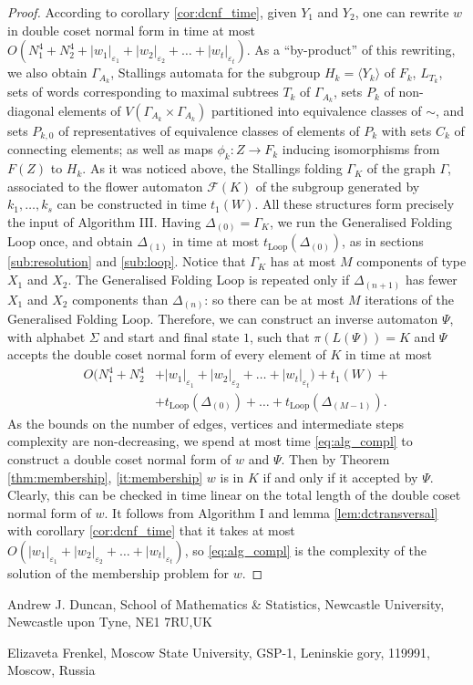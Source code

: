 \documentclass[a4paper,12pt]{article}
\newcommand{\G}{\Gamma }
\newcommand{\D}{\Delta }
\newcommand{\e}{\varepsilon }
\newcommand{\cF}{{\cal{F}}}
\numberwithin{equation}{section}
\numberwithin{figure}{section}
\newcommand{\Loop}{\operatorname{Loop}}
\renewcommand{\cF}{\mathcal{F}}
\newcommand{\la}{\langle}
\newcommand{\ra}{\rangle}
\newcommand{\maps}{\rightarrow}
\begin{document}
\begin{proof}
According to corollary \ref{cor:dcnf_time}, given $Y_1$ and $Y_2$, one can rewrite $w$ in double coset normal form in time at most 
$O(N_1^4 + N_2^4+ |w_1|_{\e_1}+|w_2|_{\e_2}+
\ldots +|w_t|_{\e_t}).$
 As a ``by-product'' of this rewriting, we also obtain $\G_{A_k}$, Stallings automata for the subgroup $H_k=\la Y_k\ra$ of $F_k$,
$L_{T_k}$, sets of words corresponding to maximal subtrees $T_k$ of $\G_{A_k}$,  sets $P_k$ of non-diagonal elements of $V( \G_{A_k}\times \G_{A_k})$
partitioned into equivalence classes of $\sim$, and sets $P_{k,0}$ of representatives of equivalence classes of
elements of $P_k$ with sets $C_k$ of connecting elements; as well as 
maps $\phi_k:Z\maps F_k$ inducing isomorphisms from $F(Z)$ to $H_k$. 
As it was noticed above, the Stallings folding $\G_K$ of the graph $\G$, associated to
the flower automaton $\cF(K)$ of the subgroup generated by $k_1, \ldots , k_s$ can be constructed in time  $t_1(W)$.
All these structures form precisely the input of Algorithm III. Having $\D_{(0)} = \G_K$, we run the Generalised Folding Loop once, and obtain $\D_{(1)}$ in time at most $t_{\Loop}(\D_{(0)})$, as in sections \ref{sub:resolution} and \ref{sub:loop}. 
Notice that $\G_K$ has at
most $M$ components of type $X_1$ and $X_2$.
 The Generalised Folding Loop is repeated
 only if $\D_{(n+1)}$ has fewer  $X_1$ and $X_2$ components
than $\D_{(n)}$: so there can be at most $M$ iterations of the Generalised
Folding Loop. Therefore, we can construct an inverse automaton 
 $\Psi$, with alphabet $\Sigma$ and start
and final state $1$, such that $\pi(L(\Psi))=K$ and $\Psi$ accepts the
double coset normal form of every element of $K$ in time at most 
\begin{align*}
O(N_1^4 + N_2^4 & + |w_1|_{\e_1}+|w_2|_{\e_2}+
\ldots +|w_t|_{\e_t})+ t_1(W) +\\ &+ t_{\Loop}(\D_{(0)}) + \ldots + t_{\Loop}(\D_{(M-1)}).
\end{align*}
As the bounds on the number of
edges, vertices and intermediate steps complexity are non-decreasing, we spend at most time \eqref{eq:alg_compl} to construct a double coset normal form of $w$ and $\Psi$. 
Then by Theorem \ref{thm:membership}, \ref{it:membership} $w$ is in $K$ if and only if it accepted by $\Psi$. Clearly, this can be checked in time linear on the total length of the double coset normal form of $w$. It follows from Algorithm I and lemma \ref{lem:dctransversal} with corollary \ref{cor:dcnf_time} that it takes at most $O(|w_1|_{\e_1}+|w_2|_{\e_2}+
\ldots +|w_t|_{\e_t})$, so \eqref{eq:alg_compl} is the complexity of the solution of the membership problem for $w$.
\end{proof}




\medskip
\noindent\textsf{Andrew J. Duncan, School of Mathematics \&
Statistics, Newcastle University, Newcastle upon Tyne, NE1 7RU,UK}


\noindent \textsf{Elizaveta Frenkel, Moscow State University,
GSP-1, Leninskie gory, 119991, Moscow, Russia}

\end{document}
